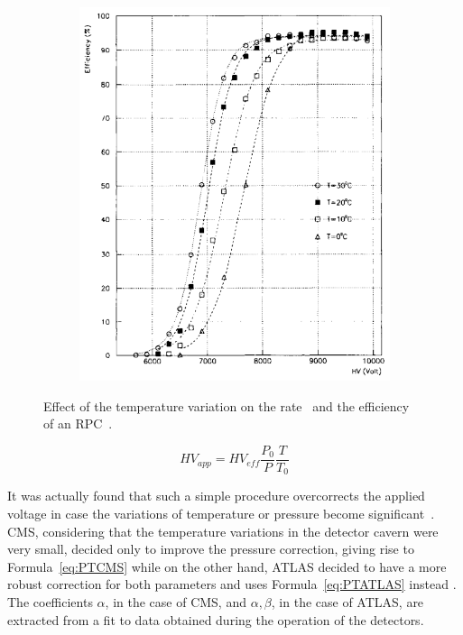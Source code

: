 \begin{figure}
\begin{subfigure}{\linewidth}
			\includegraphics[width = \linewidth]{fig/chapt3/Efficiency-temperature.png}
			\caption{\label{fig:TCorr:B}}
		\end{subfigure}
		\caption{\label{fig:TCorr} Effect of the temperature variation on the rate~ and the efficiency~ of an RPC~\cite{ABBRESCIA1995}.}
	\end{figure}
	
	\vspace*{1cm}
	\begin{equation}
	\label{eq:PTSimple}
	HV_{app} = HV_{eff}\frac{P_0}{P}\frac{T}{T_0}
	\end{equation}
	
	It was actually found that such a simple procedure overcorrects the applied voltage in case the variations of temperature or pressure become significant~\cite{ABBRESCIA2013,FILIP2014,BIANCO2007,BIANCO2009}. CMS, considering that the temperature variations in the detector cavern were very small, decided only to improve the pressure correction, giving rise to Formula~\ref{eq:PTCMS} \cite{ABBRESCIA2013} while on the other hand, ATLAS decided to have a more robust correction for both parameters and uses Formula~\ref{eq:PTATLAS} instead \cite{BIANCO2009}. The coefficients $\alpha$, in the case of CMS, and $\alpha,\beta$, in the case of ATLAS, are extracted from a fit to data obtained during the operation of the detectors.
	
